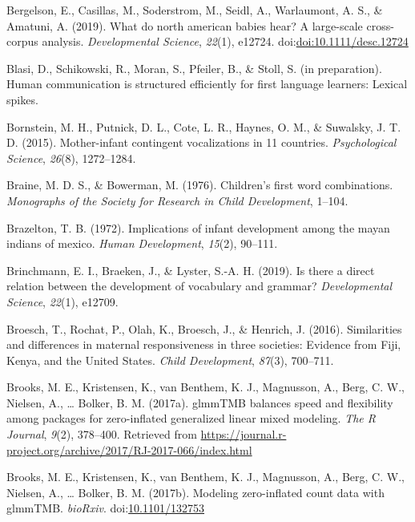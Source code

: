 \documentclass[floatsintext,man]{apa6}
\theoremstyle{definition}
\theoremstyle{definition}
\theoremstyle{definition}
\theoremstyle{remark}
\begin{document}
\hypertarget{ref-bergelsoncasillas2019what}{}
Bergelson, E., Casillas, M., Soderstrom, M., Seidl, A., Warlaumont, A.
S., \& Amatuni, A. (2019). What do north american babies hear? A
large-scale cross-corpus analysis. \emph{Developmental Science},
\emph{22}(1), e12724.
doi:\href{https://doi.org/doi:10.1111/desc.12724}{doi:10.1111/desc.12724}

\hypertarget{ref-blasiIPhuman}{}
Blasi, D., Schikowski, R., Moran, S., Pfeiler, B., \& Stoll, S. (in
preparation). Human communication is structured efficiently for first
language learners: Lexical spikes.

\hypertarget{ref-bornstein2015mother}{}
Bornstein, M. H., Putnick, D. L., Cote, L. R., Haynes, O. M., \&
Suwalsky, J. T. D. (2015). Mother-infant contingent vocalizations in 11
countries. \emph{Psychological Science}, \emph{26}(8), 1272--1284.

\hypertarget{ref-braine1976childrens}{}
Braine, M. D. S., \& Bowerman, M. (1976). Children's first word
combinations. \emph{Monographs of the Society for Research in Child
Development}, 1--104.

\hypertarget{ref-brazelton1972implications}{}
Brazelton, T. B. (1972). Implications of infant development among the
mayan indians of mexico. \emph{Human Development}, \emph{15}(2),
90--111.

\hypertarget{ref-brinchmann2019direct}{}
Brinchmann, E. I., Braeken, J., \& Lyster, S.-A. H. (2019). Is there a
direct relation between the development of vocabulary and grammar?
\emph{Developmental Science}, \emph{22}(1), e12709.

\hypertarget{ref-broesch2016similarities}{}
Broesch, T., Rochat, P., Olah, K., Broesch, J., \& Henrich, J. (2016).
Similarities and differences in maternal responsiveness in three
societies: Evidence from Fiji, Kenya, and the United States. \emph{Child
Development}, \emph{87}(3), 700--711.

\hypertarget{ref-R-glmmTMB}{}
Brooks, M. E., Kristensen, K., van Benthem, K. J., Magnusson, A., Berg,
C. W., Nielsen, A., \ldots{} Bolker, B. M. (2017a). glmmTMB balances
speed and flexibility among packages for zero-inflated generalized
linear mixed modeling. \emph{The R Journal}, \emph{9}(2), 378--400.
Retrieved from
\url{https://journal.r-project.org/archive/2017/RJ-2017-066/index.html}

\hypertarget{ref-brooks2017modeling}{}
Brooks, M. E., Kristensen, K., van Benthem, K. J., Magnusson, A., Berg,
C. W., Nielsen, A., \ldots{} Bolker, B. M. (2017b). Modeling
zero-inflated count data with glmmTMB. \emph{bioRxiv}.
doi:\href{https://doi.org/10.1101/132753}{10.1101/132753}
\end{document}
